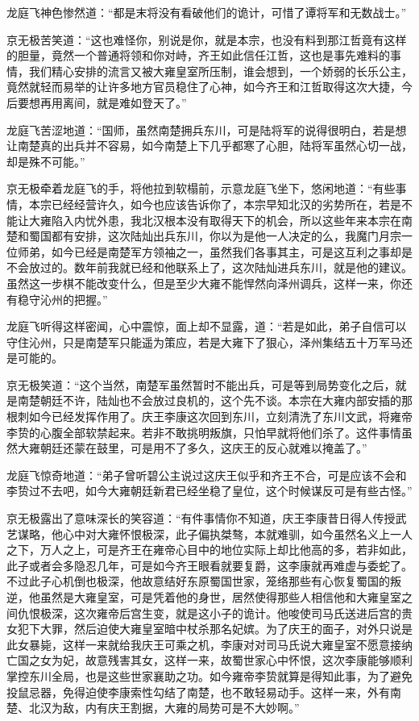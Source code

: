 龙庭飞神色惨然道：“都是末将没有看破他们的诡计，可惜了谭将军和无数战士。”

京无极苦笑道：“这也难怪你，别说是你，就是本宗，也没有料到那江哲竟有这样的胆量，竟然一个普通将领和你对峙，齐王如此信任江哲，这也是事先难料的事情，我们精心安排的流言又被大雍皇室所压制，谁会想到，一个娇弱的长乐公主，竟然就轻而易举的让许多地方官员稳住了心神，如今齐王和江哲取得这次大捷，今后要想再用离间，就是难如登天了。”

龙庭飞苦涩地道：“国师，虽然南楚拥兵东川，可是陆将军的说得很明白，若是想让南楚真的出兵并不容易，如今南楚上下几乎都寒了心胆，陆将军虽然心切一战，却是殊不可能。”

京无极牵着龙庭飞的手，将他拉到软榻前，示意龙庭飞坐下，悠闲地道：“有些事情，本宗已经经营许久，如今也应该告诉你了，本宗早知北汉的劣势所在，若是不能让大雍陷入内忧外患，我北汉根本没有取得天下的机会，所以这些年来本宗在南楚和蜀国都有安排，这次陆灿出兵东川，你以为是他一人决定的么，我魔门月宗一位师弟，如今已经是南楚军方领袖之一，虽然我们各事其主，可是这互利之事却是不会放过的。数年前我就已经和他联系上了，这次陆灿进兵东川，就是他的建议。虽然这一步棋不能改变什么，但是至少大雍不能悍然向泽州调兵，这样一来，你还有稳守沁州的把握。”

龙庭飞听得这样密闻，心中震惊，面上却不显露，道：“若是如此，弟子自信可以守住沁州，只是南楚军只能遥为策应，若是大雍下了狠心，泽州集结五十万军马还是可能的。

京无极笑道：“这个当然，南楚军虽然暂时不能出兵，可是等到局势变化之后，就是南楚朝廷不许，陆灿也不会放过良机的，这个先不谈。本宗在大雍内部安插的那根刺如今已经发挥作用了。庆王李康这次回到东川，立刻清洗了东川文武，将雍帝李贽的心腹全部软禁起来。若非不敢挑明叛旗，只怕早就将他们杀了。这件事情虽然大雍朝廷还蒙在鼓里，可是用不了多久，这庆王的反心就难以掩盖了。”

龙庭飞惊奇地道：“弟子曾听碧公主说过这庆王似乎和齐王不合，可是应该不会和李贽过不去吧，如今大雍朝廷新君已经坐稳了皇位，这个时候谋反可是有些古怪。”

京无极露出了意味深长的笑容道：“有件事情你不知道，庆王李康昔日得人传授武艺谋略，他心中对大雍怀恨极深，此子偏执桀骜，本就难驯，如今虽然名义上一人之下，万人之上，可是齐王在雍帝心目中的地位实际上却比他高的多，若非如此，此子或者会多隐忍几年，可是如今齐王眼看就要复爵，这李康就再难虚与委蛇了。不过此子心机倒也极深，他故意结好东原蜀国世家，笼络那些有心恢复蜀国的叛逆，他虽然是大雍皇室，可是凭着他的身世，居然使得那些人相信他和大雍皇室之间仇恨极深，这次雍帝后宫生变，就是这小子的诡计。他唆使司马氏送进后宫的贵女犯下大罪，然后迫使大雍皇室暗中杖杀那名妃嫔。为了庆王的面子，对外只说是此女暴毙，这样一来就给我庆王可乘之机，李康对对司马氏说大雍皇室不愿意接纳亡国之女为妃，故意残害其女，这样一来，故蜀世家心中怀恨，这次李康能够顺利掌控东川全局，也是这些世家襄助之功。如今雍帝李贽就算是得知此事，为了避免投鼠忌器，免得迫使李康索性勾结了南楚，也不敢轻易动手。这样一来，外有南楚、北汉为敌，内有庆王割据，大雍的局势可是不大妙啊。”

